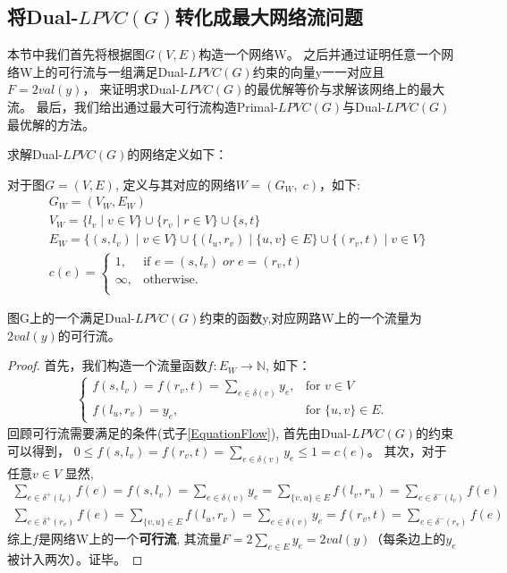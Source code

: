 \subsection{将Dual-$LPVC(G)$转化成最大网络流问题} \label{TransformToNetwork}
本节中我们首先将根据图$G(V, E)$构造一个网络W。
之后并通过证明任意一个网络W上的可行流与一组满足Dual-$LPVC(G)$约束的向量y一一对应且$F = 2val(y)$，
来证明求Dual-$LPVC(G)$的最优解等价与求解该网络上的最大流。
最后，我们给出通过最大可行流构造Primal-$LPVC(G)$与Dual-$LPVC(G)$最优解的方法。

求解Dual-$LPVC(G)$的网络定义如下：
\begin{definition}
对于图$G = (V, E)$, 定义与其对应的网络$W = (G_W,\; c)$，如下:
\begin{equation*}\begin{aligned}
    &G_W = (V_W, E_W) \\
    &V_W = \{l_v\;|\;v \in V\} \cup \{r_v\;|\;r \in V\} \cup \{ s, t \} \\
    &E_W = \{(s, l_v)\;|\;v \in V\} \cup \{(l_u, r_v)\;|\;\{u, v\} \in E\} \cup \{(r_v, t)\;|\;v \in V\}\\
    &c(e) =   \begin{cases}
        1, & \mbox{if } e = (s, l_v)\;or\;e = (r_v, t)\\
        \infty, & \mbox{otherwise.}\\
  \end{cases}
\end{aligned}\end{equation*}
\end{definition}

\begin{property}
图G上的一个满足Dual-$LPVC(G)$约束的函数y,对应网路W上的一个流量为$2val(y)$的可行流。
\end{property}
\begin{proof}
  首先，我们构造一个流量函数$f:E_W \rightarrow \mathbb{N}$, 如下：
  \begin{equation*}\begin{aligned} \begin{cases}
    f(s, l_v) = f(r_v, t) = \sum\limits_{e \in \delta(v)}{y_e}, & \mbox{for } v \in V \\
    f(l_u, r_v) = y_e, & \mbox{for } \{u, v\} \in E.
  \end{cases}\end{aligned}\end{equation*}
  回顾可行流需要满足的条件(式子\ref{EquationFlow}), 首先由Dual-$LPVC(G)$的约束可以得到，
  $0 \le f(s, l_v) = f(r_v, t) = \sum\limits_{e \in \delta(v)}{y_e} \le 1 = c(e)$。
  其次，对于任意$v \in V$ 显然,
  \[ \begin{aligned}
     \sum_{e\in \delta^+(l_v)}{f(e)} = f(s, l_v) = \sum\limits_{e \in \delta(v)}{y_e} = \sum_{\{v, u\} \in E}{f(l_v, r_u)} = \sum_{e\in \delta^-(l_v)}{f(e)} \\
    \sum_{e\in \delta^+(r_v)}{f(e)} = \sum_{\{v, u\} \in E}{f(l_u, r_v)}  = \sum\limits_{e \in \delta(v)}{y_e} = f(r_v, t) = \sum_{e\in \delta^-(r_v)}{f(e)}
  \end{aligned} \]
  综上$f$是网络W上的一个\textbf{可行流}, 其流量$F = 2\sum_{e \in E}{y_e} = 2val(y)$（每条边上的$y_e$被计入两次）。证毕。
\end{proof}

